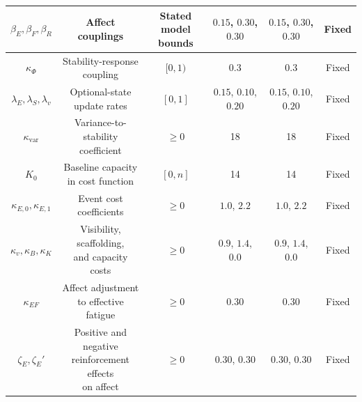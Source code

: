 \documentclass[11pt]{article}
\begin{document}
\begin{longtable}[c]{|c|c|c|c|c|c|}
         \hline
         $\beta_E, \beta_F, \beta_R$&  \makecell{Affect\\couplings}&  \makecell{Stated model\\bounds}&  $0.15$, $0.30$, $0.30$&  $0.15$, $0.30$, $0.30$& Fixed\\
         \hline
         $\kappa_\Phi$&  \makecell{Stability-response\\coupling}&  $[0,1)$&  $0.3$&  $0.3$& Fixed\\
         \hline
         $\lambda_E, \lambda_S, \lambda_v$&  \makecell{Optional-state\\update rates}&  $[0,1]$&  $0.15$, $0.10$, $0.20$&  $0.15$, $0.10$, $0.20$& Fixed\\
         \hline
         $\kappa_{\text{var}}$&  \makecell{Variance-to-stability\\coefficient}&  $\ge0$&  18&  18& Fixed\\
         \hline
         $K_0$&  \makecell{Baseline capacity\\in cost function}&  $[0,n]$&  14&  14& Fixed\\
         \hline
         $\kappa_{E,0}, \kappa_{E,1}$&  \makecell{Event cost\\coefficients}&  $\ge0$&  $1.0$, $2.2$&  $1.0$, $2.2$& Fixed\\
         \hline
         $\kappa_v, \kappa_B, \kappa_K$&  \makecell{Visibility,\\scaffolding,\\and capacity costs}&  $\ge0$&  $0.9$, $1.4$, $0.0$&  $0.9$, $1.4$, $0.0$& Fixed\\
         \hline
         $\kappa_{EF}$&  \makecell{Affect adjustment\\to effective fatigue}&  $\ge0$&  $0.30$&  $0.30$& Fixed\\
         \hline
         $\zeta_E, \zeta_E'$&  \makecell{Positive and negative\\reinforcement effects\\on affect}&  $\ge0$&  $0.30$, $0.30$&  $0.30$, $0.30$& Fixed\\
         \hline
\end{longtable}
\endgroup
\begingroup
\small
\setlength{\tabcolsep}{3pt}
\renewcommand{\arraystretch}{1.08}
\end{document}
